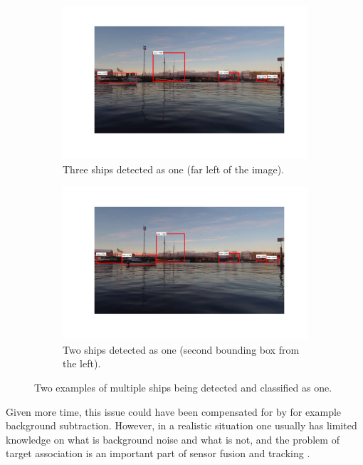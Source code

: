 \begin{figure}
	\centering
	\begin{subfigure}[t]{.5\textwidth}
		\centering
		\includegraphics[width=\linewidth]{fig/issue_overlapping.png}
		\caption{Three ships detected as one (far left of the image).}
		\label{fig:sub_issue1}
	\end{subfigure}%
	\begin{subfigure}[t]{.5\textwidth}
		\centering
		\includegraphics[width=\linewidth]{fig/issue_2.png}
		\caption{Two ships detected as one (second bounding box from the left).}
		\label{fig:sub_issue2}
	\end{subfigure}
	\caption{Two examples of multiple ships being detected and classified as one.}
	\label{fig:issues_multiple_detections}
\end{figure} 
Given more time, this issue could have been compensated for by for example background subtraction. However, in a realistic situation one usually has limited knowledge on what is background noise and what is not, and the problem of target association is an important part of sensor fusion and tracking . 
\cleardoublepage